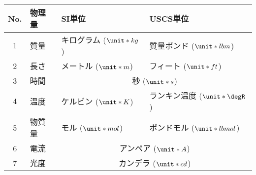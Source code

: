 \begin{tabular}{clll}
\index{SIたんい@SI単位}%
 No. & 物理量 & SI単位 & USCS単位 \\
 \hline
 1 & 質量 & キログラム ($\unit*{kg}$) & 質量ポンド ($\unit*{lbm}$) \\
 2 & 長さ & メートル ($\unit*{m}$) & フィート ($\unit*{ft}$) \\
 3 & 時間 & \multicolumn{2}{c}{秒 ($\unit*{s}$)} \\
 4 & 温度 & ケルビン ($\unit*{K}$) & ランキン温度 ($\unit*{\degR}$) \\
 5 & 物質量 & モル ($\unit*{mol}$)\footnotemark & ポンドモル ($\unit*{lbmol}$) \\
 6 & 電流 & \multicolumn{2}{c}{アンペア ($\unit*{A}$)} \\
 7 & 光度 & \multicolumn{2}{c}{カンデラ ($\unit*{cd}$)} \\
 \hline
\end{tabular}
